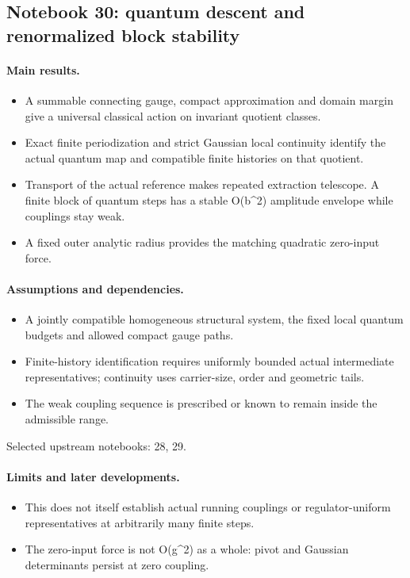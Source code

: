 \subsection{Notebook 30: quantum descent and renormalized block stability}
\label{hnc-30}
\noindent{}\par

\paragraph{Main results.}
\begin{itemize}
\item A summable connecting gauge, compact approximation and domain margin give a universal classical action on invariant quotient classes.
\item Exact finite periodization and strict Gaussian local continuity identify the actual quantum map and compatible finite histories on that quotient.
\item Transport of the actual reference makes repeated extraction telescope. A finite block of quantum steps has a stable O(b\textasciicircum{}2) amplitude envelope while couplings stay weak.
\item A fixed outer analytic radius provides the matching quadratic zero-input force.
\end{itemize}

\paragraph{Assumptions and dependencies.}
\begin{itemize}
\item A jointly compatible homogeneous structural system, the fixed local quantum budgets and allowed compact gauge paths.
\item Finite-history identification requires uniformly bounded actual intermediate representatives; continuity uses carrier-size, order and geometric tails.
\item The weak coupling sequence is prescribed or known to remain inside the admissible range.
\end{itemize}

Selected upstream notebooks: 28, 29.\par

\paragraph{Limits and later developments.}
\begin{itemize}
\item This does not itself establish actual running couplings or regulator-uniform representatives at arbitrarily many finite steps.
\item The zero-input force is not O(g\textasciicircum{}2) as a whole: pivot and Gaussian determinants persist at zero coupling.
\end{itemize}

